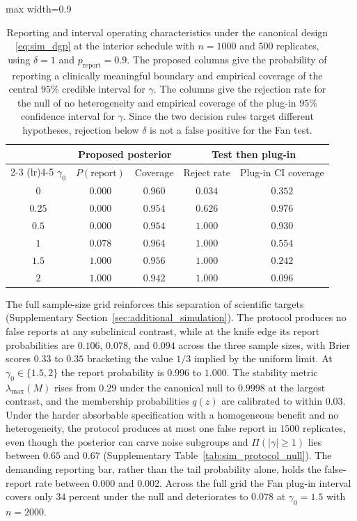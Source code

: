 \documentclass[11pt]{article}
\theoremstyle{definition}
\theoremstyle{plain}
\begin{document}
\begin{table}[!htbp]
  \centering
  \caption{Reporting and interval operating characteristics under the canonical design \eqref{eq:sim_dgp} at the interior schedule with $n=1000$ and $500$ replicates, using $\delta=1$ and $p_{\mathrm{report}}=0.9$. The proposed columns give the probability of reporting a clinically meaningful boundary and empirical coverage of the central $95\%$ credible interval for $\gamma$. The \citet{Fan2017} columns give the rejection rate for the null of no heterogeneity and empirical coverage of the plug-in $95\%$ confidence interval for $\gamma$. Since the two decision rules target different hypotheses, rejection below $\delta$ is not a false positive for the Fan test.}
  \label{tab:sim_protocol}
  \begin{adjustbox}{max width=0.9\textwidth}
  \begin{tabular}{c cc cc}
    \toprule
    & \multicolumn{2}{c}{Proposed posterior} & \multicolumn{2}{c}{Test then plug-in} \\
    \cmidrule(lr){2-3} \cmidrule(lr){4-5}
    $\gamma_0$ & $P(\mathrm{report})$ & Coverage & Reject rate & Plug-in CI coverage \\
    \midrule
    $0$    & $0.000$ & $0.960$ & $0.034$ & $0.352$ \\
    $0.25$ & $0.000$ & $0.954$ & $0.626$ & $0.976$ \\
    $0.5$  & $0.000$ & $0.954$ & $1.000$ & $0.930$ \\
    $1$    & $0.078$ & $0.964$ & $1.000$ & $0.554$ \\
    $1.5$  & $1.000$ & $0.956$ & $1.000$ & $0.242$ \\
    $2$    & $1.000$ & $0.942$ & $1.000$ & $0.096$ \\
    \bottomrule
  \end{tabular}
  \end{adjustbox}
\end{table}

The full sample-size grid reinforces this separation of scientific targets (Supplementary Section~\ref{sec:additional_simulation}). The protocol produces no false reports at any subclinical contrast, while at the knife edge its report probabilities are $0.106$, $0.078$, and $0.094$ across the three sample sizes, with Brier scores $0.33$ to $0.35$ bracketing the value $1/3$ implied by the uniform limit. At $\gamma_0\in\{1.5,2\}$ the report probability is $0.996$ to $1.000$. The stability metric $\lambda_{\max}(M)$ rises from $0.29$ under the canonical null to $0.9998$ at the largest contrast, and the membership probabilities $q(z)$ are calibrated to within $0.03$. Under the harder absorbable specification with a homogeneous benefit and no heterogeneity, the protocol produces at most one false report in $1500$ replicates, even though the posterior can carve noise subgroups and $\Pi(|\gamma|\ge1)$ lies between $0.65$ and $0.67$ (Supplementary Table~\ref{tab:sim_protocol_null}). The demanding reporting bar, rather than the tail probability alone, holds the false-report rate between $0.000$ and $0.002$. Across the full grid the Fan plug-in interval covers only $34$ percent under the null and deteriorates to $0.078$ at $\gamma_0=1.5$ with $n=2000$.
\end{document}
